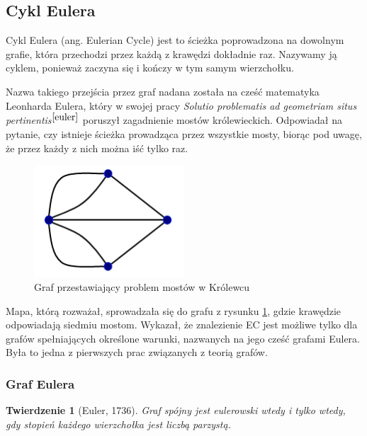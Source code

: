\documentclass[a4paper, 12pt, twoside, openright]{article}
\newtheorem{theorem}{Twierdzenie}[section]
\begin{document}
\subsection{Cykl Eulera} \label{SciezkaEulera}

\indent\par
	Cykl Eulera (ang. Eulerian Cycle) jest to ścieżka poprowadzona na dowolnym grafie, która przechodzi przez każdą z krawędzi dokładnie raz. Nazywamy ją cyklem, ponieważ zaczyna się i kończy w tym samym wierzchołku. 
	
	Nazwa takiego przejścia przez graf nadana została na cześć matematyka Leonharda Eulera, który w swojej pracy \textit{Solutio problematis ad geometriam situs pertinentis}$^{\cite{euler}}$ poruszył zagadnienie mostów królewieckich. Odpowiadał na pytanie, czy istnieje ścieżka prowadząca przez wszystkie mosty, biorąc pod uwagę, że przez każdy z nich można iść tylko raz. 
	
	\begin{figure}[htb]
		\centering
		\includegraphics[width=0.5\textwidth]{WSTEP1}
		\caption[]{Graf przestawiający problem mostów w Królewcu}
		\label{krolewiec}
	\end{figure}

	Mapa, którą rozważał, sprowadzała się do grafu z rysunku \ref{krolewiec}, gdzie krawędzie odpowiadają siedmiu mostom. Wykazał, że znalezienie EC jest możliwe tylko dla grafów spełniających określone warunki, nazwanych na jego cześć grafami Eulera. Była to jedna z pierwszych prac związanych z teorią grafów.
	
	\subsubsection{Graf Eulera}
	\begin{theorem}[Euler, 1736]
		\label{twEuleraUG}
		Graf spójny jest eulerowski wtedy i tylko wtedy, gdy
		stopień każdego wierzchołka jest liczbą parzystą.	
	\end{theorem}
\end{document}
